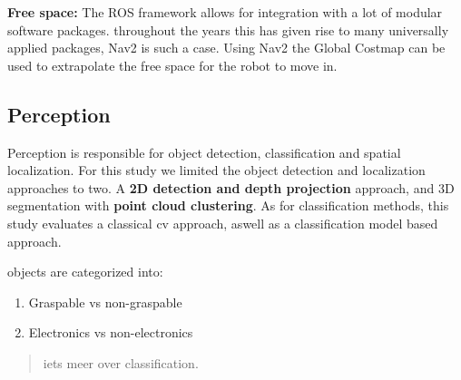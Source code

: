 \begin{paracol}
\textbf{Free space:}
The ROS framework allows for integration with a lot of modular software packages. throughout the years this has given rise to many universally applied packages, Nav2 is such a case.
Using Nav2 the Global Costmap can be used to extrapolate the free space for the robot to move in.

\subsection{Perception}

Perception is responsible for object detection, classification and spatial localization. For this study we limited the object detection and localization approaches to two. A \textbf{2D detection and depth projection} approach, and 3D segmentation with \textbf{point cloud clustering}.
As for classification methods, this study evaluates a classical cv approach, aswell as a classification model based approach.

objects are categorized into:

\begin{enumerate}
\item Graspable vs non-graspable
\item Electronics vs non-electronics
\end{enumerate}

\begin{quote}
iets meer over classification.
\end{quote}
\end{paracol}